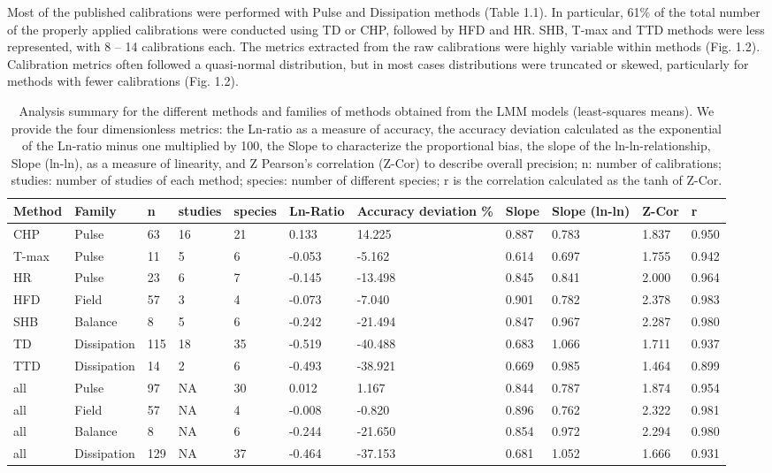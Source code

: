 \documentclass[11pt,twoside]{reedthesis}
\begin{document}
Most of the published calibrations were performed with Pulse and
Dissipation methods (Table 1.1). In particular, 61\% of the total number
of the properly applied calibrations were conducted using TD or CHP,
followed by HFD and HR. SHB, T-max and TTD methods were less
represented, with 8 -- 14 calibrations each. The metrics extracted from
the raw calibrations were highly variable within methods (Fig. 1.2).
Calibration metrics often followed a quasi-normal distribution, but in
most cases distributions were truncated or skewed, particularly for
methods with fewer calibrations (Fig. 1.2).\par
\begin{table}[!h]

\caption{\label{tab:Ch1T1}Analysis summary for the different methods and families of methods obtained from the LMM models (least-squares means). We provide the four dimensionless metrics: the Ln-ratio as a measure of accuracy, the accuracy deviation calculated as the exponential of the Ln-ratio minus one multiplied by 100, the Slope to characterize the proportional bias, the slope of the ln-ln-relationship, Slope (ln-ln), as a measure of linearity, and Z Pearson’s correlation (Z-Cor) to describe overall precision; n: number of calibrations; studies: number of studies of each method; species: number of different species; r is the correlation calculated as the tanh of Z-Cor.}
\fontsize{6}{8}\selectfont
\begin{tabular}[t]{lllllllllll}
\toprule
Method & Family & n & studies & species & Ln-Ratio & Accuracy deviation \% & Slope & Slope (ln-ln) & Z-Cor & r\\
\midrule
CHP & Pulse & 63 & 16 & 21 & 0.133 & 14.225 & 0.887 & 0.783 & 1.837 & 0.950\\
T-max & Pulse & 11 & 5 & 6 & -0.053 & -5.162 & 0.614 & 0.697 & 1.755 & 0.942\\
HR & Pulse & 23 & 6 & 7 & -0.145 & -13.498 & 0.845 & 0.841 & 2.000 & 0.964\\
HFD & Field & 57 & 3 & 4 & -0.073 & -7.040 & 0.901 & 0.782 & 2.378 & 0.983\\
SHB & Balance & 8 & 5 & 6 & -0.242 & -21.494 & 0.847 & 0.967 & 2.287 & 0.980\\
TD & Dissipation & 115 & 18 & 35 & -0.519 & -40.488 & 0.683 & 1.066 & 1.711 & 0.937\\
TTD & Dissipation & 14 & 2 & 6 & -0.493 & -38.921 & 0.669 & 0.985 & 1.464 & 0.899\\
all & Pulse & 97 & NA & 30 & 0.012 & 1.167 & 0.844 & 0.787 & 1.874 & 0.954\\
all & Field & 57 & NA & 4 & -0.008 & -0.820 & 0.896 & 0.762 & 2.322 & 0.981\\
all & Balance & 8 & NA & 6 & -0.244 & -21.650 & 0.854 & 0.972 & 2.294 & 0.980\\
all & Dissipation & 129 & NA & 37 & -0.464 & -37.153 & 0.681 & 1.052 & 1.666 & 0.931\\
\bottomrule
\end{tabular}
\end{table}
\end{document}
